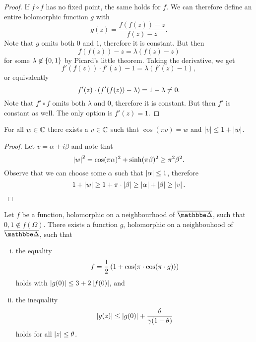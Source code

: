 \begin{proof}
If $f \circ f$ has no fixed point, the same holds for $f$. We can
therefore define an entire holomorphic function $g$ with
\[
g(z) = \frac{f(f(z)) - z}{f(z) - z}.
\]
Note that $g$ omits both $0$ and $1$, therefore it is constant. But
then
\[
f(f(z)) - z = \lambda (f(z) - z)
\]
for some $\lambda \not \in \left\{0, 1\right\}$ by Picard's little theorem.
Taking the derivative, we get
\[
f'(f(z)) \cdot f'(z) - 1 = \lambda (f'(z) - 1),
\]
or equivalently
\[
f'(z) \cdot \left(f'(f(z)) - \lambda\right) = 1 - \lambda \ne 0.
\]
Note that $f' \circ f$ omits both $\lambda$ and $0$, therefore it
is constant. But then $f'$ is constant as well. The only option is
$f'(z) = 1$.
\end{proof}


\begin{lema}
For all $w \in \mathbb{C}$ there exists a $v \in \mathbb{C}$ such that
$\cos(\pi v) = w$ and $\left\lvert v\right\rvert \leq 1 + \left\lvert w\right\rvert$.
\end{lema}

\begin{proof}
Let $v = \alpha + i \beta$ and note that
\[
\left\lvert w\right\rvert^2 =
\cos(\pi \alpha)^2 + \sinh(\pi \beta)^2 \geq
\pi^2 \beta^2.
\]
Observe that we can choose some $\alpha$ such that
$\left\lvert \alpha\right\rvert \leq 1$, therefore
\[
1 + \left\lvert w\right\rvert \geq
1 + \pi \cdot \left\lvert \beta\right\rvert \geq
\left\lvert \alpha\right\rvert + \left\lvert \beta\right\rvert \geq
\left\lvert v\right\rvert. \qedhere
\]
\end{proof}

\begin{izrek}
Let $f$ be a function, holomorphic on a neighbourhood of
$\oline{\dsk}$, such that $0, 1 \not \in f(\Omega)$. There exists a
function $g$, holomorphic on a neighbouhood of $\oline{\dsk}$, such
that

\begin{enumerate}[i)]
\item the equality
\[
f = \frac{1}{2} \left(1 + \cos(\pi \cdot \cos(\pi \cdot g))\right)
\]
holds with $\left\lvert g(0)\right\rvert \leq 3 + 2 \left\lvert f(0)\right\rvert$, and
\item the inequality
\[
\left\lvert g(z)\right\rvert \leq \left\lvert g(0)\right\rvert + \frac{\theta}{\gamma (1 - \theta)}
\]
holds for all $\left\lvert z\right\rvert \leq \theta$.
\end{enumerate}
\end{izrek}

